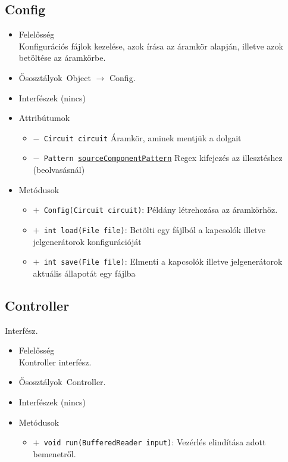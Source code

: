 \subsection{Config}
\begin{itemize}
\item Felelősség\\
Konfigurációs fájlok kezelése, azok írása az áramkör alapján, illetve azok betöltése  az áramkörbe.
\item Ősosztályok\ Object $\rightarrow{}$ Config.
\item Interfészek (nincs)
\item Attribútumok $\ $
\begin{itemize}
	\item[] \texttt{$-$ Circuit circuit} Áramkör, aminek mentjük a dolgait
	\item[] \texttt{$-$ Pattern \underline{sourceComponentPattern}} Regex kifejezés az illesztéshez (beolvasásnál)
\end{itemize}
\item Metódusok$\ $
\begin{itemize}
	\item[] \texttt{$+$ Config(Circuit circuit)}: Példány létrehozása az áramkörhöz.
	\item[] \texttt{$+$ int load(File file)}: Betölti egy fájlból a kapcsolók illetve jelgenerátorok konfigurációját
	\item[] \texttt{$+$ int save(File file)}: Elmenti a kapcsolók illetve jelgenerátorok aktuális állapotát egy fájlba
\end{itemize}
\end{itemize}

\subsection{Controller}
Interfész.
\begin{itemize}
\item Felelősség\\
Kontroller interfész.
\item Ősosztályok\ Controller.
\item Interfészek (nincs)
\item Metódusok$\ $
\begin{itemize}
	\item[] \texttt{$+$ void run(BufferedReader input)}: Vezérlés elindítása adott bemenetről.
\end{itemize}
\end{itemize}

